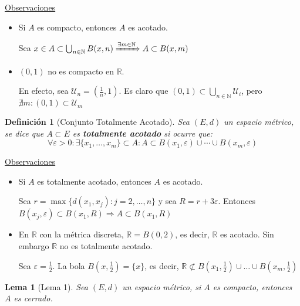 \documentclass[10pt,a4paper,openright]{book}
\theoremstyle{break}
\newtheorem*{defi}{Definición}
\newtheorem*{lema}{Lema}
\begin{document}
\underline{Observaciones}

\begin{itemize}
\item Si $A$ es compacto, entonces $A$ es acotado.

Sea $x \in A \subset \bigcup_{n \in \mathbb{N}} B(x,n) \xRightarrow{\exists m \in \mathbb{N}} A \subset B(x,m)$

\item $(0,1)$ no es compacto en $\mathbb{R}$.

En efecto, sea $\mathcal{U}_n = (\frac{1}{n}, 1)$. Es claro que $(0,1) \subset \bigcup_{n \in \mathbb{N}} \mathcal{U}_i$, pero $\nexists m : (0,1) \subset \mathcal{U}_m$
\end{itemize}

\newpage

\begin{defi}[Conjunto Totalmente Acotado]
Sea $(E,d)$ un espacio métrico, se dice que $A \subset E$ es \textbf{totalmente acotado} si ocurre que:
$$\forall \varepsilon >0: \exists \{x_1, \ldots, x_m\} \subset A : A \subset B(x_1, \varepsilon) \cup \cdots \cup B(x_m, \varepsilon)$$
\end{defi}

\underline{Observaciones}

\begin{itemize}
\item Si $A$ es totalmente acotado, entonces $A$ es acotado.

Sea $r = \max\{d(x_1, x_j) : j = 2, \ldots, n\}$ y sea $R= r + 3 \varepsilon$. Entonces $B(x_j, \varepsilon) \subset B(x_1, R) \Rightarrow A \subset B(x_1, R)$

\item En $\mathbb{R}$ con la métrica discreta, $\mathbb{R} = B(0,2)$, es decir, $\mathbb{R}$ es acotado. Sin embargo $\mathbb{R}$ no es totalmente acotado.

Sea $\varepsilon = \frac{1}{2}$. La bola $B(x, \frac{1}{2}) = \{x\}$, es decir, $\mathbb{R} \not\subset B(x_1, \frac{1}{2}) \cup \ldots \cup B(x_m, \frac{1}{2})$
\end{itemize}

\begin{lema}[Lema 1]
Sea $(E,d)$ un espacio métrico, si $A$ es compacto, entonces $A$ es cerrado.
\end{lema}
\end{document}
